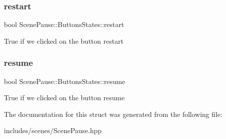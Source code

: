 \subsubsection{\texorpdfstring{restart}{restart}}
{\footnotesize\ttfamily bool Scene\+Pause\+::\+Buttons\+States\+::restart}

True if we clicked on the button restart \mbox{\label{struct_scene_pause_1_1_buttons_states_a59b513318486097a19f02f4028aa3fe8}} 
\subsubsection{\texorpdfstring{resume}{resume}}
{\footnotesize\ttfamily bool Scene\+Pause\+::\+Buttons\+States\+::resume}

True if we clicked on the button resume 

The documentation for this struct was generated from the following file\+:\begin{DoxyCompactItemize}
\item 
includes/scenes/Scene\+Pause.\+hpp\end{DoxyCompactItemize}
